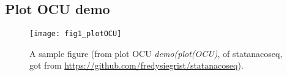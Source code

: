 \subsection{Plot OCU demo}
\begin{figure}[tb] 
\centering 
\texttt{[image: fig1\_plotOCU]} 
\caption[A sample figure from demo plotOCU]{A sample figure (from plot OCU \emph{demo(plot(OCU)}, of statanacoseq, got from \url{https://github.com/fredysiegrist/statanacoseq}).}
\label{fig:plotOCU} 
\end{figure}
